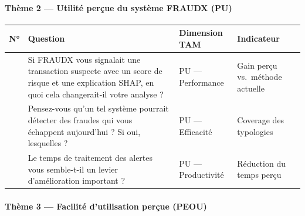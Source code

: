 \documentclass[
  12pt,
]{article}
\newcounter{none} %
\begin{document}
\paragraph{Thème 2 — Utilité perçue du système FRAUDX
(PU)}\label{thuxe8me-2-utilituxe9-peruxe7ue-du-systuxe8me-fraudx-pu}

{\def\LTcaptype{none} %
\begin{longtable}[]{@{}
  >{\raggedright\arraybackslash}p{}
  >{\raggedright\arraybackslash}p{}
  >{\raggedright\arraybackslash}p{}
  >{\raggedright\arraybackslash}p{}@{}}
\toprule\noalign{}
\begin{minipage}[b]{\linewidth}\raggedright
N°
\end{minipage} & \begin{minipage}[b]{\linewidth}\raggedright
Question
\end{minipage} & \begin{minipage}[b]{\linewidth}\raggedright
Dimension TAM
\end{minipage} & \begin{minipage}[b]{\linewidth}\raggedright
Indicateur
\end{minipage} \\
\midrule\noalign{}
\endhead
\bottomrule\noalign{}
\endlastfoot
4 & Si FRAUDX vous signalait une transaction suspecte avec un score de
risque et une explication SHAP, en quoi cela changerait-il votre analyse
? & PU — Performance & Gain perçu vs.~méthode actuelle \\
5 & Pensez-vous qu’un tel système pourrait détecter des fraudes qui vous
échappent aujourd’hui ? Si oui, lesquelles ? & PU — Efficacité &
Coverage des typologies \\
6 & Le temps de traitement des alertes vous semble-t-il un levier
d’amélioration important ? & PU — Productivité & Réduction du temps
perçu \\
\end{longtable}
}

\paragraph{Thème 3 — Facilité d’utilisation perçue
(PEOU)}\label{thuxe8me-3-facilituxe9-dutilisation-peruxe7ue-peou}
\end{document}
